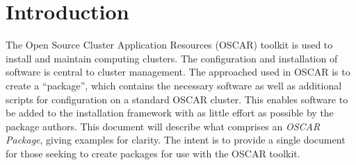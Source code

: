 
\section{Introduction}
\label{sect:intro}

The Open Source Cluster Application Resources (OSCAR) toolkit is used to
install and maintain computing clusters.  The configuration and
installation of software is central to cluster management.  The approached
used in OSCAR is to create a ``package'', which contains the necessary
software as well as additional scripts for configuration on a standard
OSCAR cluster.  This enables software to be added to the installation
framework with as little effort as possible by the package authors.  This
document will describe what comprises an \emph{OSCAR Package}, giving
examples for clarity.  The intent is to provide a single document for those
seeking to create packages for use with the OSCAR toolkit.


